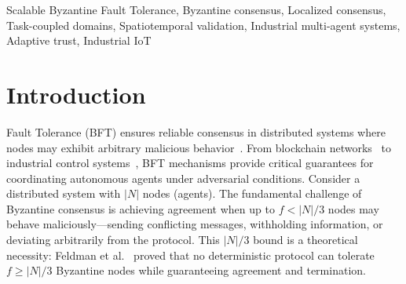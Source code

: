 \documentclass[lettersize,journal]{IEEEtran}
\begin{document}
\begin{abstract}
Traditional Practical Byzantine Fault Tolerance (PBFT) protocols require all nodes to
participate in every consensus round, resulting in $O(N^2)$ communication
complexity that limits scalability and becomes prohibitive in large-scale industrial multi-agent
systems. This paper introduces STLC (Spatiotemporal Localized Consensus with Adaptive Trust), a novel framework exploiting
spatiotemporal context and adaptive trust weights to achieve efficient
Byzantine consensus through dynamic consensus locality. We formalize
Dynamic Consensus Locality Theory, proving that consensus restricted to
task-coupled domains of size $k$ achieves equivalent safety and
liveness as global consensus while reducing complexity to $O(k^2)$. The
protocol integrates spatiotemporal validation for early malicious message
rejection, adaptive trust weights for rapid Byzantine isolation, and
replicated scheduler coordination for fault tolerance.
Experimental validation using CORE emulator (10-100 nodes) and Raspberry Pi testbed demonstrates 98.5\% message reduction versus
PBFT (1,770 $\to$ 27 messages for $k=3$, $|N|=30$), 60\% latency
improvement, 98\% detection rate for spatiotemporal attacks, and stable
performance independent of system size. STLC enables scalable and practical Byzantine
consensus for industrial deployments with 100+ agents on
resource-constrained hardware.
\end{abstract}

\begin{IEEEkeywords}
Scalable Byzantine Fault Tolerance, Byzantine consensus, Localized consensus, Task-coupled domains, Spatiotemporal validation, Industrial multi-agent systems, Adaptive trust, Industrial IoT
\end{IEEEkeywords}

\section{Introduction}
\label{sec:introduction}
 Fault Tolerance (BFT) ensures reliable consensus in distributed systems where nodes may exhibit arbitrary malicious behavior~\cite{wu2024half, liu2024improved}. From blockchain networks~\cite{dotan2021survey} to industrial control systems~\cite{bhamare2020cybersecurity}, BFT mechanisms provide critical guarantees for coordinating autonomous agents under adversarial conditions. 
Consider a distributed system with $|N|$ nodes (agents). The fundamental challenge of Byzantine consensus is achieving agreement when up to $f < |N|/3$ nodes may behave maliciously—sending conflicting messages, withholding information, or deviating arbitrarily from the protocol. This $|N|/3$ bound is a theoretical necessity: Feldman et al.~\cite{feldman1997optimal} 
proved that no deterministic protocol can tolerate $f \geq |N|/3$ Byzantine nodes 
while guaranteeing agreement and termination.
\end{document}

